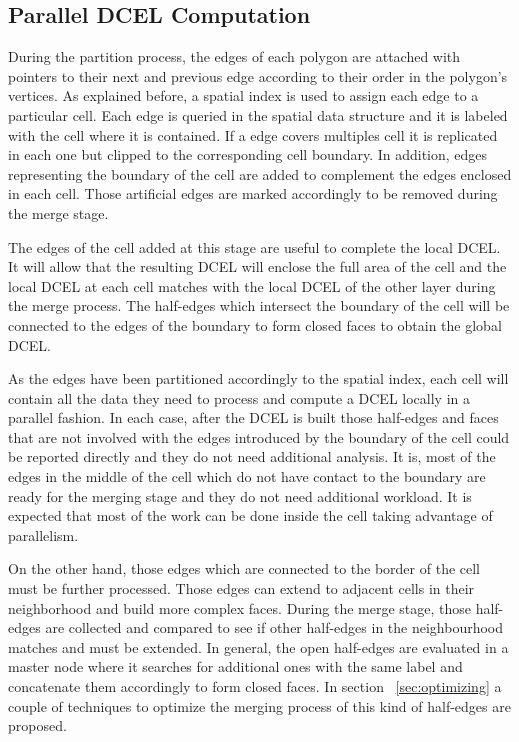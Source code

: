 \subsection{Parallel DCEL Computation}

During the partition process, the edges of each polygon are attached with pointers to their next and previous edge according to their order in the polygon's vertices.  As explained before, a spatial index is used to assign each edge to a particular cell.  Each edge is queried in the spatial data structure and it is labeled with the cell where it is contained.  If a edge covers multiples cell it is replicated in each one but clipped to the corresponding cell boundary.  In addition, edges representing the boundary of the cell are added to complement the edges enclosed in each cell.  Those artificial edges are marked accordingly to be removed during the merge stage.

The edges of the cell added at this stage are useful to complete the local DCEL.  It will allow that the resulting DCEL will enclose the full area of the cell and the local DCEL at each cell matches with the local DCEL of the other layer during the merge process.  The half-edges which intersect the boundary of the cell will be connected to the edges of the boundary to form closed faces to obtain the global DCEL.

As the edges have been partitioned accordingly to the spatial index, each cell will contain all the data they need to process and compute a DCEL locally in a parallel fashion. In each case, after the DCEL is built those half-edges and faces that are not involved with the edges introduced by the boundary of the cell could be reported directly and they do not need additional analysis.  It is, most of the edges in the middle of the cell which do not have contact to the boundary are ready for the merging stage and they do not need additional workload.  It is expected that most of the work can be done inside the cell taking advantage of parallelism.

On the other hand, those edges which are connected to the border of the cell must be further processed.  Those edges can extend to adjacent cells in their neighborhood and build more complex faces.  During the merge stage, those half-edges are collected and compared to see if other half-edges in the neighbourhood matches and must be extended.  In general, the open half-edges are evaluated in a master node where it searches for additional ones with the same label and concatenate them accordingly to form closed faces.  In section ~\ref{sec:optimizing} a couple of techniques to optimize the merging process of this kind of half-edges are proposed.  

